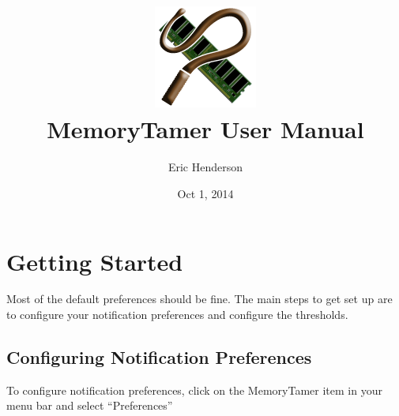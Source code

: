 \documentclass[]{article}
\begin{document}
\title{
\includegraphics[width=128px]{../resources/Icon}\\
MemoryTamer User Manual
}
\author{Eric Henderson}
\date{Oct 1, 2014}
\maketitle

\clearpage
\tableofcontents
\clearpage
\section{Getting Started}

Most of the default preferences should be fine.  The main steps to get set up are to configure your notification preferences and configure the thresholds.

\subsection{Configuring Notification Preferences}
To configure notification preferences, click on the MemoryTamer item in your menu bar and select ``Preferences''
\end{document}
